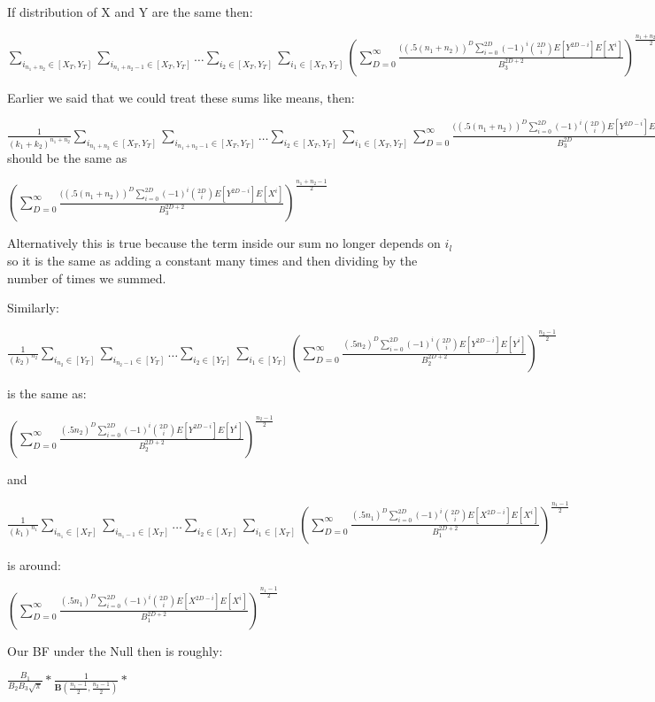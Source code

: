 \documentclass[11pt]{article}
\begin{document}
If distribution of X and Y are the same then:

$ \sum_{i_{n_1 + n_2} \in [X_T, Y_T]} \sum_{i_{n_1 + n_2-1}\in [X_T, Y_T]} \ldots  \sum_{i_{2}\in [X_T, Y_T]} \sum_{i_{1}\in [X_T, Y_T]} (\sum_{D=0}^\infty \frac{((.5(n_1 + n_2))^D \sum_{i=0}^{2D} (-1)^i \binom{2D}{i}E[Y^{2D-i}]E[X^{i}]}{B_3^{2D+2}})^{\frac{n_1 + n_2 -1}{2}}  $ 

Earlier we said that we could treat these sums like means, then:

$ \frac{1}{(k_1+k_2)^{n_1+n_2}} \sum_{i_{n_1 + n_2} \in [X_T, Y_T]} \sum_{i_{n_1 + n_2-1}\in [X_T, Y_T]} \ldots  \sum_{i_{2}\in [X_T, Y_T]} \sum_{i_{1}\in [X_T, Y_T]} \sum_{D=0}^\infty \frac{((.5(n_1 + n_2))^D \sum_{i=0}^{2D} (-1)^i \binom{2D}{i}E[Y^{2D-i}]E[X^{i}]}{B_3^{2D}}  $ should be the same as 

$(\sum_{D=0}^\infty \frac{((.5(n_1 + n_2))^D \sum_{i=0}^{2D} (-1)^i \binom{2D}{i}E[Y^{2D-i}]E[X^{i}]}{B_3^{2D+2}})^{\frac{n_1+n_2 - 1}{2}} $

Alternatively this is true because the term inside our sum no longer depends on $i_l$ so it is the same as adding a constant many times and then dividing by the number of times we summed.

Similarly:

 $ \frac{1}{(k_2)^{n_2}} \sum_{i_{n_2} \in [Y_T]} \sum_{i_{n_2-1}\in [Y_T]} \ldots  \sum_{i_{2}\in [Y_T]} \sum_{i_{1}\in [Y_T]} (\sum_{D=0}^\infty \frac{(.5n_2)^D \sum_{i=0}^{2D} (-1)^i \binom{2D}{i}E[Y^{2D-i}]E[Y^{i}]}{B_2^{2D+2}})^{\frac{n_2 - 1}{2}}    $

is the same as:

$(\sum_{D=0}^\infty \frac{(.5n_2)^D \sum_{i=0}^{2D} (-1)^i \binom{2D}{i}E[Y^{2D-i}]E[Y^{i}]}{B_2^{2D+2}})^{\frac{n_2 - 1}{2}} $

and 

 $ \frac{1}{(k_1)^{n_1}} \sum_{i_{n_1} \in [X_T]} \sum_{i_{n_1-1}\in [X_T]} \ldots  \sum_{i_{2}\in [X_T]} \sum_{i_{1}\in [X_T]}  (\sum_{D=0}^\infty \frac{(.5n_1)^D \sum_{i=0}^{2D} (-1)^i \binom{2D}{i}E[X^{2D-i}]E[X^{i}]}{B_1^{2D+2}})^{\frac{n_1 - 1}{2}}   $

is around: 

$(\sum_{D=0}^\infty \frac{(.5n_1)^D \sum_{i=0}^{2D} (-1)^i \binom{2D}{i}E[X^{2D-i}]E[X^{i}]}{B_1^{2D+2}})^{\frac{n_1 - 1}{2}}$ 

Our BF under the Null then is roughly:

$\frac{B_1}{B_2 B_3 \sqrt{\pi}} * \frac{1}{ \mathbf{B}(\frac{n_1 -1}{2}, \frac{n_2 -1}{2})} * $
\end{document}
